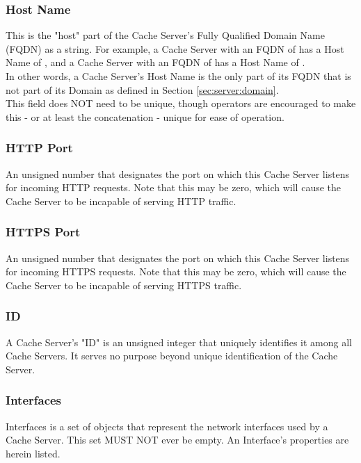 \subsubsection{Host Name\label{sec:server:hostname}}
This is the "host" part of the Cache Server's Fully Qualified Domain Name (FQDN)
as a string. For example, a Cache Server with an FQDN of  has a
Host Name of , and a Cache Server with an FQDN of
 has a Host Name of .\\
In other words, a Cache Server's Host Name is the only part of its FQDN that
is not part of its Domain as defined in Section \ref{sec:server:domain}.\\
This field does NOT need to be unique, though operators are encouraged to make
this - or at least the concatenation  - unique
for ease of operation.

\subsubsection{HTTP Port}
An unsigned number that designates the port on which this Cache Server listens
for incoming HTTP requests. Note that this may be zero, which will cause the
Cache Server to be incapable of serving HTTP traffic.

\subsubsection{HTTPS Port}
An unsigned number that designates the port on which this Cache Server listens
for incoming HTTPS requests. Note that this may be zero, which will cause the
Cache Server to be incapable of serving HTTPS traffic.

\subsubsection{ID}
A Cache Server's "ID" is an unsigned integer that uniquely identifies it among
all Cache Servers. It serves no purpose beyond unique identification of the
Cache Server.

\subsubsection{Interfaces}
Interfaces is a set of objects that represent the network interfaces used by a
Cache Server. This set MUST NOT ever be empty. An Interface's properties are
herein listed.


